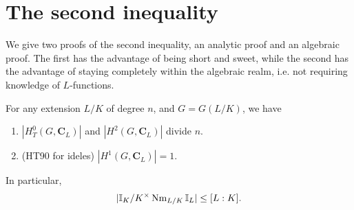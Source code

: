 \section{The second inequality}%
We give two proofs of the second inequality, an analytic proof and an algebraic proof. The first has the advantage of being short and sweet, while the second has the advantage of staying completely within the algebraic realm, i.e. not requiring knowledge of $L$-functions.
\begin{thm}
For any extension $L/K$ of degree $n$, and $G=G(L/K)$, we have
\begin{enumerate}
\item
$|H_T^0(G,\mathbf C_L)|$ and $|H^2(G,\mathbf C_L)|$ divide $n$.
\item (HT90 for ideles)
$|H^1(G,\mathbf C_L)|=1$.
\end{enumerate}
In particular,
\[
|\mathbb{I}_K/K^{\times}\operatorname{Nm}_{L/K}\mathbb{I}_L|\le [L:K].
\]
\end{thm}
